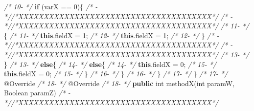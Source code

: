 \documentclass[
]{article}
\newenvironment{Shaded}{\begin{snugshade}}{\end{snugshade}}
\newcommand{\AttributeTok}[1]{\textcolor[rgb]{0.77,0.63,0.00}{#1}}
\newcommand{\BuiltInTok}[1]{#1}
\newcommand{\CommentTok}[1]{\textcolor[rgb]{0.56,0.35,0.01}{\textit{#1}}}
\newcommand{\DataTypeTok}[1]{\textcolor[rgb]{0.13,0.29,0.53}{#1}}
\newcommand{\DecValTok}[1]{\textcolor[rgb]{0.00,0.00,0.81}{#1}}
\newcommand{\FunctionTok}[1]{\textcolor[rgb]{0.00,0.00,0.00}{#1}}
\newcommand{\KeywordTok}[1]{\textcolor[rgb]{0.13,0.29,0.53}{\textbf{#1}}}
\newcommand{\NormalTok}[1]{#1}
\begin{document}
\begin{landscape}
\begin{Shaded}
\begin{Highlighting}[]
\CommentTok{/* 10-                 */}        \KeywordTok{if}\NormalTok{ (varX == }\DecValTok{0}\NormalTok{)\{                                        }\CommentTok{/*   -                 *//*XXXXXXXXXXXXXXXXXXXXXXXXXXXXXXXXXXXXXX*/}                     
\CommentTok{/*   -                 *//*XXXXXXXXXXXXXXXXXXXXXXXXXXXXXXXXXXXXXX*/}                     \CommentTok{/* 11-                 */}\NormalTok{        \{                                                      }
\CommentTok{/* 11-                 */}            \KeywordTok{this}\NormalTok{.}\FunctionTok{fieldX}\NormalTok{ = }\DecValTok{1}\NormalTok{;                                   }\CommentTok{/* 12-                 */}            \KeywordTok{this}\NormalTok{.}\FunctionTok{fieldX}\NormalTok{ = }\DecValTok{1}\NormalTok{;                                   }
\CommentTok{/* 12-                 */}\NormalTok{        \}                                                      }\CommentTok{/*   -                 *//*XXXXXXXXXXXXXXXXXXXXXXXXXXXXXXXXXXXXXX*/}                     
\CommentTok{/*   -                 *//*XXXXXXXXXXXXXXXXXXXXXXXXXXXXXXXXXXXXXX*/}                     \CommentTok{/* 13-                 */}\NormalTok{        \}                                                                }
\CommentTok{/* 13-                 */}        \KeywordTok{else}\NormalTok{\{                                                  }\CommentTok{/* 14-                 */}        \KeywordTok{else}\NormalTok{\{                                                  }
\CommentTok{/* 14-                 */}            \KeywordTok{this}\NormalTok{.}\FunctionTok{fieldX}\NormalTok{ = }\DecValTok{0}\NormalTok{;                                   }\CommentTok{/* 15-                 */}            \KeywordTok{this}\NormalTok{.}\FunctionTok{fieldX}\NormalTok{ = }\DecValTok{0}\NormalTok{;                                   }
\CommentTok{/* 15-                 */}\NormalTok{        \}                                                      }\CommentTok{/* 16-                 */}\NormalTok{        \}                                                      }
\CommentTok{/* 16-                 */}\NormalTok{    \}                                                          }\CommentTok{/* 17-                 */}\NormalTok{    \}                                                          }
\CommentTok{/* 17-                 */}    \AttributeTok{@Override}                                                  \CommentTok{/* 18-                 */}    \AttributeTok{@Override}                                                  
\CommentTok{/* 18-                 */}    \KeywordTok{public} \DataTypeTok{int} \FunctionTok{methodX}\NormalTok{(}\DataTypeTok{int}\NormalTok{ paramW, }\BuiltInTok{Boolean}\NormalTok{ paramZ)             }\CommentTok{/*   -                 *//*XXXXXXXXXXXXXXXXXXXXXXXXXXXXXXXXXXXXXX*/}                     

\end{Highlighting}
\end{Shaded}
\end{landscape}
\end{document}
